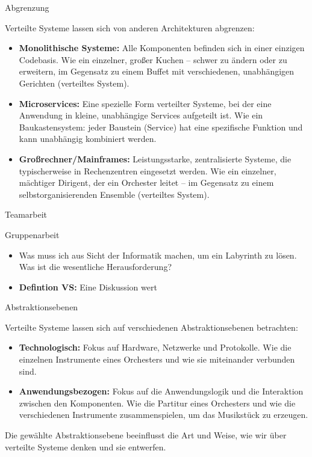 \documentclass{beamer}
\begin{document}
\begin{frame}{Abgrenzung}

    Verteilte Systeme lassen sich von anderen Architekturen abgrenzen:

    \begin{itemize}
        \item \textbf{Monolithische Systeme:}  Alle Komponenten befinden sich in einer einzigen Codebasis.  Wie ein einzelner, großer Kuchen – schwer zu ändern oder zu erweitern, im Gegensatz zu einem Buffet mit verschiedenen, unabhängigen Gerichten (verteiltes System).
        \item \textbf{Microservices:} Eine spezielle Form verteilter Systeme, bei der eine Anwendung in kleine, unabhängige Services aufgeteilt ist. Wie ein Baukastensystem: jeder Baustein (Service) hat eine spezifische Funktion und kann unabhängig kombiniert werden.
        \item \textbf{Großrechner/Mainframes:} Leistungsstarke, zentralisierte Systeme, die typischerweise in Rechenzentren eingesetzt werden. Wie ein einzelner, mächtiger Dirigent, der ein Orchester leitet – im Gegensatz zu einem selbstorganisierenden Ensemble (verteiltes System).
    \end{itemize}

\end{frame}


\begin{frame}{Teamarbeit}

   Gruppenarbeit

    \begin{itemize}
        \item Was muss ich aus Sicht der Informatik machen, um ein Labyrinth zu lösen. Was ist die wesentliche Herausforderung?
        \item \textbf{Defintion VS:} Eine Diskussion wert 
    \end{itemize}

\end{frame}

\begin{frame}{Abstraktionsebenen}

    Verteilte Systeme lassen sich auf verschiedenen Abstraktionsebenen betrachten:

    \begin{itemize}
        \item \textbf{Technologisch:} Fokus auf Hardware, Netzwerke und Protokolle.  Wie die einzelnen Instrumente eines Orchesters und wie sie miteinander verbunden sind.
        \item \textbf{Anwendungsbezogen:} Fokus auf die Anwendungslogik und die Interaktion zwischen den Komponenten.  Wie die Partitur eines Orchesters und wie die verschiedenen Instrumente zusammenspielen, um das Musikstück zu erzeugen.
    \end{itemize}

    Die gewählte Abstraktionsebene beeinflusst die Art und Weise, wie wir über verteilte Systeme denken und sie entwerfen.

\end{frame}
\end{document}
